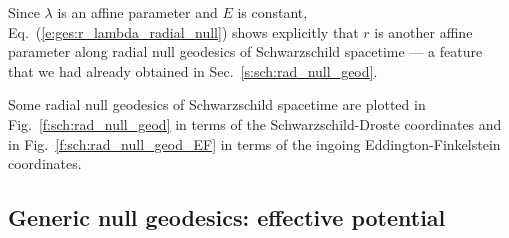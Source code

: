 \begin{remark}
Since $\lambda$ is an affine parameter and $E$ is constant,
Eq.~(\ref{e:ges:r_lambda_radial_null})
shows explicitly that $r$ is another affine parameter along radial null
geodesics of Schwarzschild spacetime --- a feature that we had already
obtained in Sec.~\ref{s:sch:rad_null_geod}.
\end{remark}

Some radial null geodesics of Schwarzschild spacetime are plotted in
Fig.~\ref{f:sch:rad_null_geod} in terms of the Schwarzschild-Droste coordinates
and in Fig.~\ref{f:sch:rad_null_geod_EF} in terms of the ingoing Eddington-Finkelstein coordinates.



\subsection{Generic null geodesics: effective potential}
\label{s:gis:null_eff_pot}

